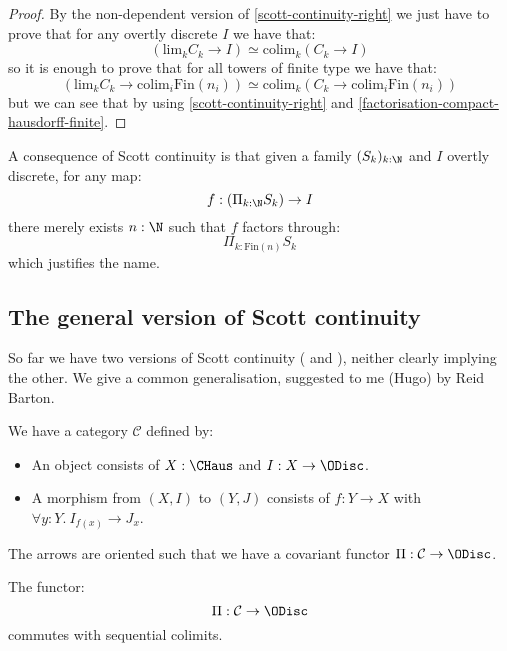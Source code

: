 \begin{proof}
By the non-dependent version of \cref{scott-continuity-right} we just have to prove that for any overtly discrete $I$ we have that:
\[(\mathrm{lim}_kC_k\to I) \simeq \mathrm{colim}_k(C_k\to I)\]
so it is enough to prove that for all towers of finite type we have that:
\[(\mathrm{lim}_kC_k\to \mathrm{colim}_i\mathrm{Fin}(n_i)) \simeq \mathrm{colim}_k(C_k\to \mathrm{colim}_i\mathrm{Fin}(n_i))\]
but we can see that by using \cref{scott-continuity-right} and \cref{factorisation-compact-hausdorff-finite}.
\end{proof}

\begin{remark}
A consequence of Scott continuity is that given a family $(S_k)_{k:\N}$ and $I$ overtly discrete, for any map:
\[f: \left(\Pi_{k:\N} S_k\right) \to I\]
there merely exists $n:\N$ such that $f$ factors through:
\[\Pi_{k:\mathrm{Fin}(n)} S_k\]
which justifies the name.
\end{remark}

\subsection{The general version of Scott continuity}

So far we have two versions of Scott continuity ( and ), neither clearly implying the other. We give a common generalisation, suggested to me (Hugo) by Reid Barton.

\begin{definition}
We have a category $\mathcal C$ defined by:
\begin{itemize}
\item An object consists of $X:\CHaus$ and $I:X\to \ODisc$.
\item A morphism from $(X,I)$ to $(Y,J)$ consists of $f:Y\to X$ with $\forall y:Y.\ I_{f(x)}\to J_x$.
\end{itemize}
\end{definition}

The arrows are oriented such that we have a covariant functor $\Pi:{\mathcal C}\to \ODisc$.

\begin{theorem}
The functor:
\[\Pi : {\mathcal C} \to \ODisc\]
commutes with sequential colimits.
\end{theorem}

